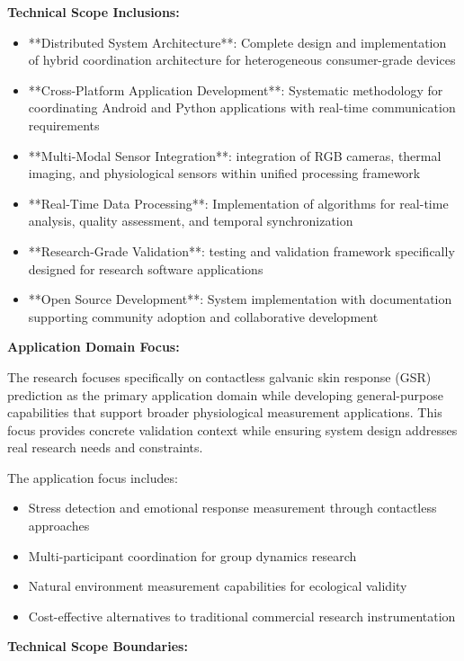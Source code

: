 \documentclass[11pt,a4paper]{article}
\begin{document}
\textbf{Technical Scope Inclusions:}

\begin{itemize}
\item **Distributed System Architecture**: Complete design and implementation of hybrid coordination architecture for
  heterogeneous consumer-grade devices
\item **Cross-Platform Application Development**: Systematic methodology for coordinating Android and Python applications
  with real-time communication requirements
\item **Multi-Modal Sensor Integration**: integration of RGB cameras, thermal imaging, and physiological
  sensors within unified processing framework
\item **Real-Time Data Processing**: Implementation of algorithms for real-time analysis, quality assessment,
  and temporal synchronization
\item **Research-Grade Validation**: testing and validation framework specifically designed for research
  software applications
\item **Open Source Development**: System implementation with documentation supporting community
  adoption and collaborative development

\end{itemize}
\textbf{Application Domain Focus:}

The research focuses specifically on contactless galvanic skin response (GSR)
prediction as the primary application
domain while developing general-purpose capabilities that support broader
physiological measurement applications.  This
focus provides concrete validation context while ensuring system design addresses
real research needs and constraints.

The application focus includes:

\begin{itemize}
\item Stress detection and emotional response measurement through contactless approaches
\item Multi-participant coordination for group dynamics research
\item Natural environment measurement capabilities for ecological validity
\item Cost-effective alternatives to traditional commercial research instrumentation

\end{itemize}
\textbf{Technical Scope Boundaries:}
\end{document}
